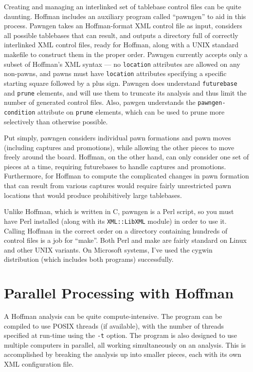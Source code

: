 \documentclass[11pt]{article}
\begin{document}
Creating and managing an interlinked set of tablebase control files
can be quite daunting.  Hoffman includes an auxiliary program called
``pawngen'' to aid in this process.  Pawngen takes an Hoffman-format
XML control file as input, considers all possible tablebases that can
result, and outputs a directory full of correctly interlinked XML
control files, ready for Hoffman, along with a UNIX standard makefile
to construct them in the proper order.  Pawngen currently accepts only
a subset of Hoffman's XML syntax --- no {\tt location} attributes are
allowed on any non-pawns, and pawns must have {\tt location}
attributes specifying a specific starting square followed by a plus
sign.  Pawngen does understand {\tt futurebase} and {\tt prune}
elements, and will use them to truncate its analysis and thus limit
the number of generated control files.  Also, pawgen understands the
{\tt pawngen-condition} attribute on {\tt prune} elements, which can
be used to prune more selectively than otherwise possible.

Put simply, pawngen considers individual pawn formations and pawn
moves (including captures and promotions), while allowing the other
pieces to move freely around the board.  Hoffman, on the other hand,
can only consider one set of pieces at a time, requiring futurebases
to handle captures and promotions.  Furthermore, for Hoffman to
compute the complicated changes in pawn formation that can result from
various captures would require fairly unrestricted pawn locations that
would produce prohibitively large tablebases.

\vfil\eject

Unlike Hoffman, which is written in C, pawngen is a Perl script, so
you must have Perl installed (along with its {\tt XML::LibXML} module)
in order to use it.  Calling Hoffman in the correct order on a
directory containing hundreds of control files is a job for ``make''.
Both Perl and make are fairly standard on Linux and other UNIX
variants.  On Microsoft systems, I've used the cygwin distribution
(which includes both programs) successfully.

\section{Parallel Processing with Hoffman}

A Hoffman analysis can be quite compute-intensive.  The program can be
compiled to use POSIX threads (if available), with the number of
threads specified at run-time using the {\tt -t} option.  The program
is also designed to use multiple computers in parallel, all working
simultaneously on an analysis.  This is accomplished by breaking the
analysis up into smaller pieces, each with its own XML configuration
file.
\end{document}
